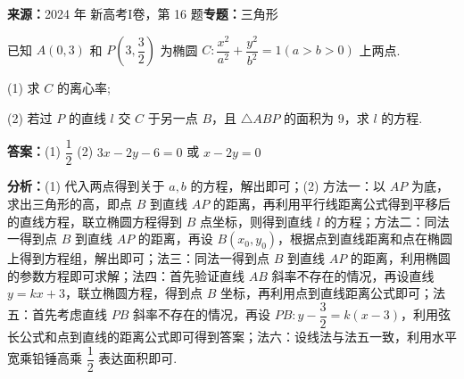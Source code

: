 \begin{question}[points=15]
\textbf{来源：}2024 年 新高考I卷，第 16 题\quad \textbf{专题：}三角形\par
已知 $A(0,3)$ 和 $P\left(3,\dfrac{3}{2}\right)$ 为椭圆 $C:\dfrac{x^2}{a^2}+\dfrac{y^2}{b^2}=1(a>b>0)$ 上两点.

(1) 求 $C$ 的离心率;

(2) 若过 $P$ 的直线 $l$ 交 $C$ 于另一点 $B$，且 $\triangle ABP$ 的面积为 $9$，求 $l$ 的方程.
\begin{solution}
\textbf{答案：}(1) $\dfrac{1}{2}$ (2) $3x-2y-6=0$ 或 $x-2y=0$

\textbf{分析：}(1) 代入两点得到关于 $a,b$ 的方程，解出即可；(2) 方法一：以 $AP$ 为底，求出三角形的高，即点 $B$ 到直线 $AP$ 的距离，再利用平行线距离公式得到平移后的直线方程，联立椭圆方程得到 $B$ 点坐标，则得到直线 $l$ 的方程；方法二：同法一得到点 $B$ 到直线 $AP$ 的距离，再设 $B(x_0,y_0)$，根据点到直线距离和点在椭圆上得到方程组，解出即可；法三：同法一得到点 $B$ 到直线 $AP$ 的距离，利用椭圆的参数方程即可求解；法四：首先验证直线 $AB$ 斜率不存在的情况，再设直线 $y=kx+3$，联立椭圆方程，得到点 $B$ 坐标，再利用点到直线距离公式即可；法五：首先考虑直线 $PB$ 斜率不存在的情况，再设 $PB: y-\dfrac{3}{2}=k(x-3)$，利用弦长公式和点到直线的距离公式即可得到答案；法六：设线法与法五一致，利用水平宽乘铅锤高乘 $\dfrac{1}{2}$ 表达面积即可.


\end{solution}
\end{question}
